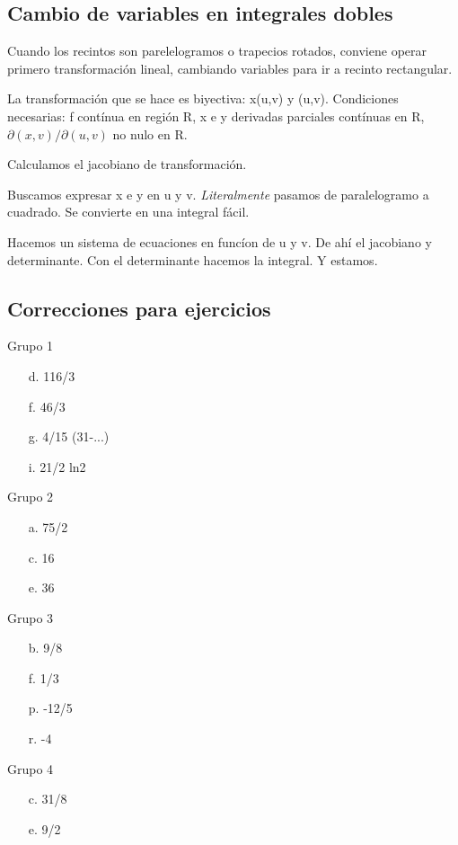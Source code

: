 \subsection{Cambio de variables en integrales dobles}

Cuando los recintos son parelelogramos o trapecios rotados,
conviene operar primero transformación lineal,
cambiando variables para ir a recinto rectangular.

La transformación que se hace es biyectiva: x(u,v) y (u,v).
Condiciones necesarias: f contínua en región R,
x e y derivadas parciales contínuas en R,
\(\partial(x,v)/\partial(u,v)\) no nulo en R.

Calculamos el jacobiano de transformación.

Buscamos expresar x e y en u y v.
\textit{Literalmente} pasamos de paralelogramo a cuadrado.
Se convierte en una integral fácil.

Hacemos un sistema de ecuaciones en funcíon de u y v.
De ahí el jacobiano y determinante.
Con el determinante hacemos la integral.
Y estamos.

\subsection{Correcciones para ejercicios}

Grupo 1
\begin{enumerate}
    \item [d.] 116/3
    \item [f.] 46/3
    \item [g.] 4/15 (31-...)
    \item [i.] 21/2 ln2
\end{enumerate}

Grupo 2
\begin{enumerate}
    \item [a.] 75/2
    \item [c.] 16
    \item [e.] 36
\end{enumerate}

Grupo 3
\begin{enumerate}
    \item [b.] 9/8
    \item [f.] 1/3
    \item [p.] -12/5
    \item [r.] -4
\end{enumerate}

Grupo 4
\begin{enumerate}
    \item [c.] 31/8
    \item [e.] 9/2
\end{enumerate}
